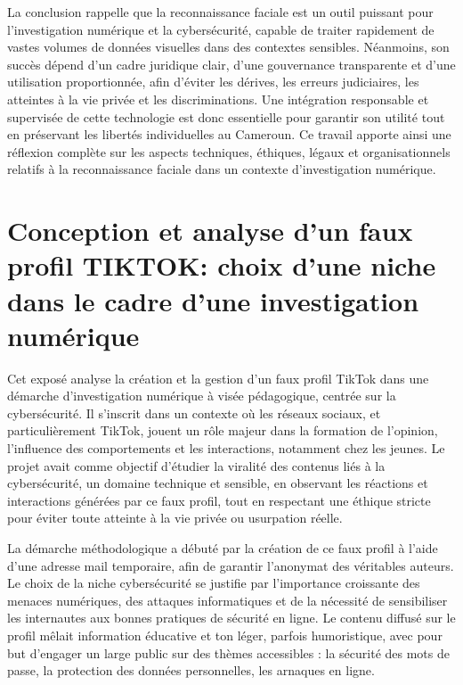 \documentclass[11pt,a4paper]{article}
\begin{document}
	La conclusion rappelle que la reconnaissance faciale est un outil puissant pour l’investigation numérique et la cybersécurité, capable de traiter rapidement de vastes volumes de données visuelles dans des contextes sensibles. Néanmoins, son succès dépend d’un cadre juridique clair, d’une gouvernance transparente et d’une utilisation proportionnée, afin d’éviter les dérives, les erreurs judiciaires, les atteintes à la vie privée et les discriminations. Une intégration responsable et supervisée de cette technologie est donc essentielle pour garantir son utilité tout en préservant les libertés individuelles au Cameroun. Ce travail apporte ainsi une réflexion complète sur les aspects techniques, éthiques, légaux et organisationnels relatifs à la reconnaissance faciale dans un contexte d’investigation numérique.
	
	\section{ Conception et analyse d'un faux profil TIKTOK: choix d'une niche dans le cadre d'une investigation numérique}
	\vspace{0.5cm}
	Cet exposé analyse la création et la gestion d'un faux profil TikTok dans une démarche d'investigation numérique à visée pédagogique, centrée sur la cybersécurité. Il s'inscrit dans un contexte où les réseaux sociaux, et particulièrement TikTok, jouent un rôle majeur dans la formation de l'opinion, l'influence des comportements et les interactions, notamment chez les jeunes. Le projet avait comme objectif d'étudier la viralité des contenus liés à la cybersécurité, un domaine technique et sensible, en observant les réactions et interactions générées par ce faux profil, tout en respectant une éthique stricte pour éviter toute atteinte à la vie privée ou usurpation réelle.
	
	La démarche méthodologique a débuté par la création de ce faux profil à l'aide d'une adresse mail temporaire, afin de garantir l'anonymat des véritables auteurs. Le choix de la niche cybersécurité se justifie par l'importance croissante des menaces numériques, des attaques informatiques et de la nécessité de sensibiliser les internautes aux bonnes pratiques de sécurité en ligne. Le contenu diffusé sur le profil mêlait information éducative et ton léger, parfois humoristique, avec pour but d'engager un large public sur des thèmes accessibles : la sécurité des mots de passe, la protection des données personnelles, les arnaques en ligne.
	
\end{document}
